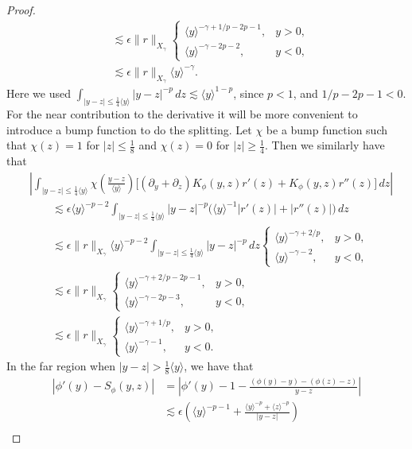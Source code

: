 \documentclass[11pt]{amsart}
\theoremstyle{definition}
\theoremstyle{remark}
\numberwithin{equation}{section}
\newcommand{\ang}[1]{\langle #1 \rangle}
\begin{document}
\begin{proof}
\begin{align*}
    & \lesssim \epsilon \|r\|_{X_\gamma}\begin{cases}
        \ang{y}^{-\gamma+1/p-2p-1}, & y>0,\\
        \ang{y}^{-\gamma-2p-2}, & y<0,
    \end{cases}\\
    & \lesssim \epsilon \|r\|_{X_\gamma}\ang{y}^{-\gamma}.
\end{align*}
Here we used $\int_{|y - z| \leq \frac{1}{4}\ang{y}}|y-z|^{-p}\,dz\lesssim\ang{y}^{1-p}$, since $p<1$, and $1/p-2p-1<0$. For the near contribution to the derivative it will be more convenient to introduce a bump function to do the splitting. Let $\chi$ be a bump function such that $\chi(z) = 1$ for $|z| \leq \frac{1}{8}$ and $\chi(z) = 0$ for $|z| \geq \frac{1}{4}$. Then we similarly have that
\begin{align*}
    &\left|\int_{|y - z| \leq \frac{1}{4}\ang{y}} \chi\left(\frac{y - z}{\ang{y}}\right) \bigl[(\partial_y+\partial_z)K_\phi(y,z)r'(z)+K_\phi(y,z)r''(z)\bigr]\,dz\right|\\
    &\qquad\lesssim\epsilon\ang{y}^{-p-2}\int_{|y - z| \leq \frac{1}{4}\ang{y}}|y-z|^{-p}\bigl(\ang{y}^{-1}|r'(z)|+|r''(z)|\bigr)\,dz\\
    &\qquad\lesssim\epsilon\|r\|_{X_\gamma}\ang{y}^{-p-2}\int_{|y - z| \leq \frac{1}{4}\ang{y}}|y-z|^{-p}\,dz\begin{cases}
        \ang{y}^{-\gamma+2/p}, & y>0,\\
        \ang{y}^{-\gamma-2}, & y<0,
    \end{cases}\\
    &\qquad\lesssim\epsilon\|r\|_{X_\gamma}\begin{cases}
        \ang{y}^{-\gamma+2/p-2p-1}, & y>0,\\
        \ang{y}^{-\gamma-2p-3}, & y<0,
    \end{cases}\\
    &\qquad\lesssim\epsilon\|r\|_{X_\gamma}\begin{cases}
        \ang{y}^{-\gamma+1/p}, & y>0,\\
        \ang{y}^{-\gamma-1}, & y<0.
    \end{cases}
\end{align*}
In the far region when $|y - z| > \frac{1}{8}\ang{y}$, we have that
\begin{align*}
    |\phi'(y) - S_\phi(y, z)| &= \left|\phi'(y) - 1 - \frac{(\phi(y) - y) - (\phi(z) - z)}{y - z}\right| \\
    & \lesssim \epsilon\left(\ang{y}^{-p-1} + \frac{\ang{y}^{-p} + \ang{z}^{-p}}{|y - z|}\right) \\

\end{align*}
\end{proof}
\end{document}
